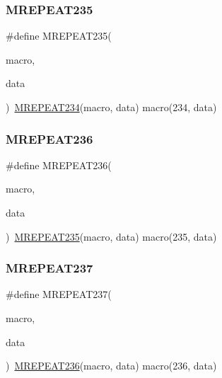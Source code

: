 \mbox{\label{group__group__sam0__utils__mrepeat_ga5d3644eeaec5d2fe9d9055cc6581ed1d}} 
\subsubsection{\texorpdfstring{MREPEAT235}{MREPEAT235}}
{\footnotesize\ttfamily \#define M\+R\+E\+P\+E\+A\+T235(\begin{DoxyParamCaption}\item[{}]{macro,  }\item[{}]{data }\end{DoxyParamCaption})~\mbox{\hyperlink{group__group__sam0__utils__mrepeat_gadff2111488b4bd5fc5d6407ec9dccefd}{M\+R\+E\+P\+E\+A\+T234}}(macro, data)   macro(234, data)}

\mbox{\label{group__group__sam0__utils__mrepeat_ga91157712363f58affa1ae6b2feb50747}} 
\subsubsection{\texorpdfstring{MREPEAT236}{MREPEAT236}}
{\footnotesize\ttfamily \#define M\+R\+E\+P\+E\+A\+T236(\begin{DoxyParamCaption}\item[{}]{macro,  }\item[{}]{data }\end{DoxyParamCaption})~\mbox{\hyperlink{group__group__sam0__utils__mrepeat_ga5d3644eeaec5d2fe9d9055cc6581ed1d}{M\+R\+E\+P\+E\+A\+T235}}(macro, data)   macro(235, data)}

\mbox{\label{group__group__sam0__utils__mrepeat_ga0e49a6a0b3047b2d3ec37912f6f15c7a}} 
\subsubsection{\texorpdfstring{MREPEAT237}{MREPEAT237}}
{\footnotesize\ttfamily \#define M\+R\+E\+P\+E\+A\+T237(\begin{DoxyParamCaption}\item[{}]{macro,  }\item[{}]{data }\end{DoxyParamCaption})~\mbox{\hyperlink{group__group__sam0__utils__mrepeat_ga91157712363f58affa1ae6b2feb50747}{M\+R\+E\+P\+E\+A\+T236}}(macro, data)   macro(236, data)}

